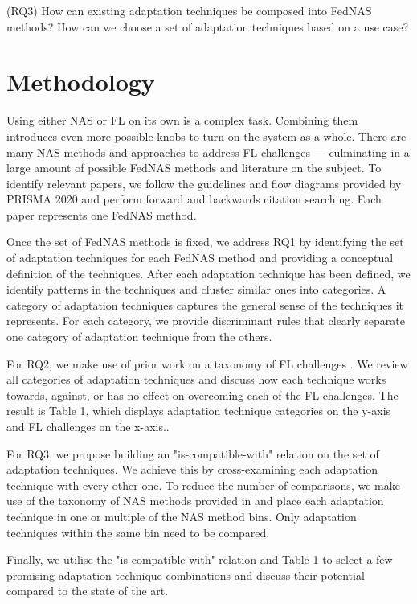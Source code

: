 \vspace{1em}
(RQ3) How can existing adaptation techniques be composed into FedNAS methods? How can we choose a set of adaptation techniques based on a use case?
\vspace{1em}

\section{Methodology}

Using either NAS or FL on its own is a complex task. Combining them introduces even more possible knobs to turn on the system as a whole. There are many NAS methods and approaches to address FL challenges — culminating in a large amount of possible FedNAS methods and literature on the subject. To identify relevant papers, we follow the guidelines and flow diagrams provided by PRISMA 2020 \cite{prisma_2020} and perform forward and backwards citation searching. Each paper represents one FedNAS method.

Once the set of FedNAS methods is fixed, we address RQ1 by identifying the set of adaptation techniques for each FedNAS method and providing a conceptual definition of the techniques. After each adaptation technique has been defined, we identify patterns in the techniques and cluster similar ones into categories. A category of adaptation techniques captures the general sense of the techniques it represents. For each category, we provide discriminant rules that clearly separate one category of adaptation technique from the others.

For RQ2, we make use of prior work on a taxonomy of FL challenges \cite{fl_taxonomy_2024}. We review all categories of adaptation techniques and discuss how each technique works towards, against, or has no effect on overcoming each of the FL challenges. The result is Table 1, which displays adaptation technique categories on the y-axis and FL challenges on the x-axis..

For RQ3, we propose building an "is-compatible-with" relation on the set of adaptation techniques. We achieve this by cross-examining each adaptation technique with every other one. To reduce the number of comparisons, we make use of the taxonomy of NAS methods provided in \cite{nas_1000_papers_2023} and place each adaptation technique in one or multiple of the NAS method bins. Only adaptation techniques within the same bin need to be compared.

Finally, we utilise the "is-compatible-with" relation and Table 1 to select a few promising adaptation technique combinations and discuss their potential compared to the state of the art.